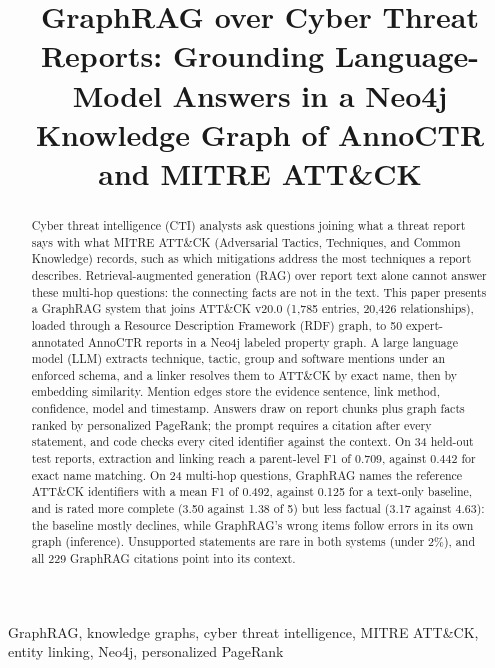 \documentclass[conference,letterpaper]{IEEEtran}
\begin{document}
\title{GraphRAG over Cyber Threat Reports: Grounding Language-Model Answers in a Neo4j Knowledge Graph of AnnoCTR and MITRE ATT\&CK}

\author{
}

\maketitle

\begin{abstract}
Cyber threat intelligence (CTI) analysts ask questions joining what a threat report says with what MITRE ATT\&CK (Adversarial Tactics, Techniques, and Common Knowledge) records, such as which mitigations address the most techniques a report describes. Retrieval-augmented generation (RAG) over report text alone cannot answer these multi-hop questions: the connecting facts are not in the text. This paper presents a GraphRAG system that joins ATT\&CK v20.0 (1,785 entries, 20,426 relationships), loaded through a Resource Description Framework (RDF) graph, to 50 expert-annotated AnnoCTR reports in a Neo4j labeled property graph. A large language model (LLM) extracts technique, tactic, group and software mentions under an enforced schema, and a linker resolves them to ATT\&CK by exact name, then by embedding similarity. Mention edges store the evidence sentence, link method, confidence, model and timestamp. Answers draw on report chunks plus graph facts ranked by personalized PageRank; the prompt requires a citation after every statement, and code checks every cited identifier against the context. On 34 held-out test reports, extraction and linking reach a parent-level F1 of 0.709, against 0.442 for exact name matching. On 24 multi-hop questions, GraphRAG names the reference ATT\&CK identifiers with a mean F1 of 0.492, against 0.125 for a text-only baseline, and is rated more complete (3.50 against 1.38 of 5) but less factual (3.17 against 4.63): the baseline mostly declines, while GraphRAG's wrong items follow errors in its own graph (inference). Unsupported statements are rare in both systems (under 2\%), and all 229 GraphRAG citations point into its context.
\end{abstract}

\begin{IEEEkeywords}
GraphRAG, knowledge graphs, cyber threat intelligence, MITRE ATT\&CK, entity linking, Neo4j, personalized PageRank
\end{IEEEkeywords}
\end{document}

